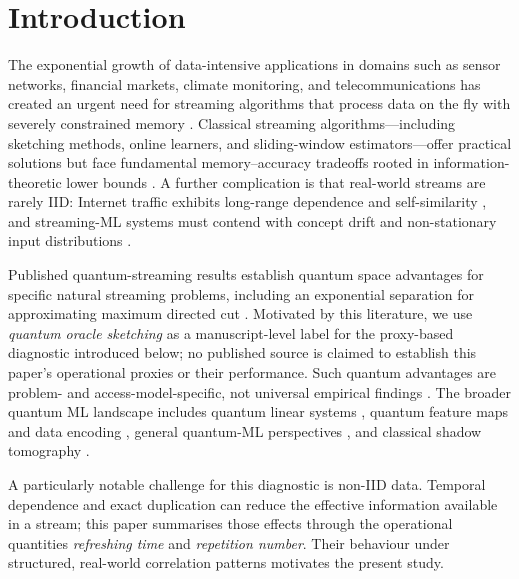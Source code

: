 \documentclass[sensors,article,submit,pdftex,moreauthors]{Definitions/mdpi}
\begin{document}
\section{Introduction}
\label{sec:intro}

The exponential growth of data-intensive applications in domains such as sensor networks, financial markets, climate monitoring, and telecommunications has created an urgent need for streaming algorithms that process data on the fly with severely constrained memory \citep{muthukrishnan2005data}. Classical streaming algorithms---including sketching methods, online learners, and sliding-window estimators---offer practical solutions but face fundamental memory--accuracy tradeoffs rooted in information-theoretic lower bounds \citep{alon1999space}. A further complication is that real-world streams are rarely IID: Internet traffic exhibits long-range dependence and self-similarity \citep{leland1994ethernet, willinger1997selfsimilarity}, and streaming-ML systems must contend with concept drift and non-stationary input distributions \citep{gama2014driftsurvey, arora2024driftreview, su2024elasticonline, yan2024bidynamic}.

Published quantum-streaming results establish quantum space advantages for specific natural streaming problems, including an exponential separation for approximating maximum directed cut \citep{kallaugher2021streaming, kallaugher2024maxdicut, kallaugher2025designquantum}. Motivated by this literature, we use \emph{quantum oracle sketching} as a manuscript-level label for the proxy-based diagnostic introduced below; no published source is claimed to establish this paper's operational proxies or their performance. Such quantum advantages are problem- and access-model-specific, not universal empirical findings \citep{aaronson2015readthefineprint, tang2019quantum, huang2021powerofdata}. The broader quantum ML landscape includes quantum linear systems \citep{harrow2009hhl}, quantum feature maps and data encoding \citep{havlicek2019qkernels, schuld2021encoding}, general quantum-ML perspectives \citep{biamonte2017qml, preskill2018nisq, schuld2018supervised, cerezo2021variational}, and classical shadow tomography \citep{huang2020shadows}.

A particularly notable challenge for this diagnostic is non\nobreakdash-IID data. Temporal dependence and exact duplication can reduce the effective information available in a stream; this paper summarises those effects through the operational quantities \emph{refreshing time} and \emph{repetition number}. Their behaviour under structured, real-world correlation patterns motivates the present study.
\end{document}
